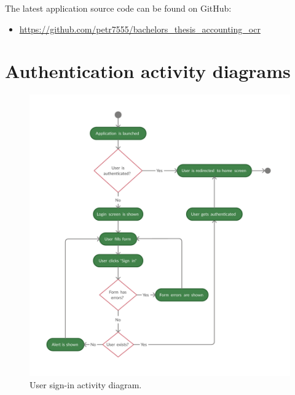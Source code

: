 \documentclass[
  digital, %
  table,   %
  oneside, %
  lof,     %
  lot,     %
]{fithesis3}
\begin{document}
The latest application source code can be found on GitHub:
\begin{itemize}
\item \url{https://github.com/petr7555/bachelors_thesis_accounting_ocr}
\end{itemize}

\section{Authentication activity diagrams}

    \begin{figure}
        \begin{center}
            \includegraphics[width=\textwidth]{figures/diagrams/sign_in_flow}
        \end{center}
        \caption{User sign-in activity diagram.}
        \label{fig:sign_in_flow}
    \end{figure}
    
\end{document}
